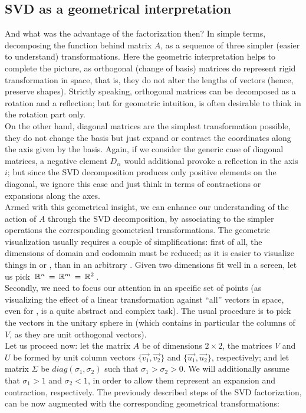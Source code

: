 \subsection{SVD as a geometrical interpretation}

And what was the advantage of the factorization then? In simple terms,
decomposing the function behind matrix $A$, as a sequence of three
simpler (easier to understand) transformations. Here the geometric
interpretation helps to complete the picture, as orthogonal (change of
basis) matrices do represent rigid transformation in space, that is,
they do not alter the lengths of vectors (hence, preserve
shapes). Strictly speaking, orthogonal matrices can be decomposed as a
rotation and a reflection; but for geometric intuition, is often
desirable to think in the rotation part only. \\

On the other hand, diagonal matrices are the simplest transformation
possible, they do not change the basis but just expand or contract the
coordinates along the axis given by the basis. Again, if we consider
the generic case of diagonal matrices, a negative element $D_{ii}$
would additional provoke a reflection in the axis $i$; but since the
SVD decomposition produces only positive elements on the diagonal, we
ignore this case and just think in terms of contractions or
expansions along the axes. \\

Armed with this geometrical insight, we can enhance our understanding
of the action of $A$ through the SVD decomposition, by associating to
the simpler operations the corresponding geometrical transformations.
The geometric visualization usually requires a couple of
simplifications: first of all, the dimensions of domain and codomain
must be reduced; as it is easier to visualize things in  or
, than in an arbitrary . Given two dimensions fit well in a
screen, let us pick $\,\mathbb{R}^{n}\, = \,\mathbb{R}^{m}\, = \,\mathbb{R}^{2}\,$. \\

Secondly, we need to focus our attention in an specific set of
points (as visualizing the effect of a linear transformation against
``all'' vectors in space, even for , is a quite abstract and
complex task). The usual procedure is to pick the vectors in the
unitary sphere in  (which contains in particular the columns of
$V$, as they are unit orthogonal vectors). \\

Let us proceed now: let the matrix $A$ be of
dimensions $2  \times 2$, the matrices $V$ and $U$ be formed
by unit column vectors $\{\vec{v_1},\vec{v_2}\}$ and $\{\vec{u_1},\vec{u_2}\}$,
respectively; and let matrix $\Sigma$ be $diag(\sigma_1,\sigma_2)$
such that $\sigma_1 > \sigma_2 > 0$. We will additionally assume that
$\sigma_1 > 1$ and $\sigma_2 < 1$, in order to allow them represent an
expansion and contraction, respectively. The previously described steps of
the SVD factorization, can be now augmented with the corresponding
geometrical transformations: \\

